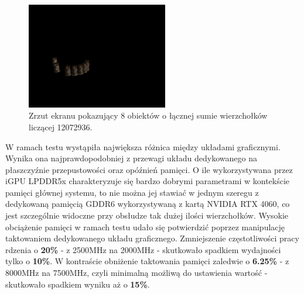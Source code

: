 \vfill
\clearpage

\begin{figure}[h!]
	\centering
	\includegraphics[width=0.55\textwidth]{images/demo_test_vertex.png}
	\caption{Zrzut ekranu pokazujący 8 obiektów o łącznej sumie wierzchołków liczącej 12072936.}
	\label{demo_test_vertex}
\end{figure}

W ramach testu wystąpiła największa różnica między układami graficznymi. Wynika ona najprawdopodobniej z przewagi układu dedykowanego na płaszczyźnie przepustowości oraz opóźnień pamięci. O ile wykorzystywana przez iGPU LPDDR5x charakteryzuje się bardzo dobrymi parametrami w kontekście pamięci głównej systemu, to nie można jej stawiać w jednym szeregu z dedykowaną pamięcią GDDR6 wykorzystywaną z kartą NVIDIA RTX 4060, co jest szczególnie widoczne przy obsłudze tak dużej ilości wierzchołków. Wysokie obciążenie pamięci w ramach testu udało się potwierdzić poprzez manipulację taktowaniem dedykowanego układu graficznego. Zmniejszenie częstotliwości pracy rdzenia o \textbf{20\%} - z 2500MHz na 2000MHz - skutkowało spadkiem wydajności tylko o \textbf{10\%}. W kontraście obniżenie taktowania pamięci zaledwie o \textbf{6.25\%} - z 8000MHz na 7500MHz, czyli minimalną możliwą do ustawienia wartość - skutkowało spadkiem wyniku aż o \textbf{15\%}.
